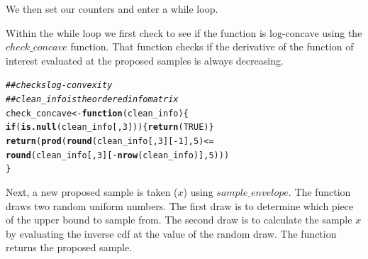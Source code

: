 \documentclass{article}\usepackage[]{graphicx}\usepackage[]{color}
\makeatletter
\newcommand{\hlnum}[1]{\textcolor[rgb]{0.686,0.059,0.569}{#1}}%
\newcommand{\hlcom}[1]{\textcolor[rgb]{0.678,0.584,0.686}{\textit{#1}}}%
\newcommand{\hlopt}[1]{\textcolor[rgb]{0,0,0}{#1}}%
\newcommand{\hlstd}[1]{\textcolor[rgb]{0.345,0.345,0.345}{#1}}%
\newcommand{\hlkwa}[1]{\textcolor[rgb]{0.161,0.373,0.58}{\textbf{#1}}}%
\newcommand{\hlkwb}[1]{\textcolor[rgb]{0.69,0.353,0.396}{#1}}%
\newcommand{\hlkwc}[1]{\textcolor[rgb]{0.333,0.667,0.333}{#1}}%
\newcommand{\hlkwd}[1]{\textcolor[rgb]{0.737,0.353,0.396}{\textbf{#1}}}%
\newenvironment{kframe}{%
 \def\at@end@of@kframe{}%
 \ifinner\ifhmode%
  \def\at@end@of@kframe{\end{minipage}}%
  \begin{minipage}{\columnwidth}%
 \fi\fi%
 \def\FrameCommand##1{\hskip\@totalleftmargin \hskip-\fboxsep
 \colorbox{shadecolor}{##1}\hskip-\fboxsep
     \hskip-\linewidth \hskip-\@totalleftmargin \hskip\columnwidth}%
 \MakeFramed {\advance\hsize-\width
   \@totalleftmargin\z@ \linewidth\hsize
   \@setminipage}}%
 {\par\unskip\endMakeFramed%
 \at@end@of@kframe}
\newenvironment{knitrout}{}{} %
\makeatother
\begin{document}
We then set our counters and enter a while loop.


Within the while loop we first check to see if the function is
log-concave using the $check\_concave$ function. That function checks
if the derivative of the function of interest evaluated at the
proposed samples is always decreasing. 

\begin{knitrout}
\color{fgcolor}\begin{kframe}
\begin{alltt}
\hlcom{## checks log-convexity}
\hlcom{## clean_info is the ordered info matrix}
\hlstd{check_concave} \hlkwb{<-} \hlkwa{function}\hlstd{(}\hlkwc{clean_info}\hlstd{)\{}
  \hlkwa{if}\hlstd{(}\hlkwd{is.null}\hlstd{(clean_info[,}\hlnum{3}\hlstd{])) \{}\hlkwd{return}\hlstd{(}\hlnum{TRUE}\hlstd{)\}}
  \hlkwd{return}\hlstd{(}\hlkwd{prod}\hlstd{(}\hlkwd{round}\hlstd{(clean_info[,}\hlnum{3}\hlstd{][}\hlopt{-}\hlnum{1}\hlstd{],}\hlnum{5}\hlstd{)} \hlopt{<=}
              \hlkwd{round}\hlstd{(clean_info[,}\hlnum{3}\hlstd{][}\hlopt{-}\hlkwd{nrow}\hlstd{(clean_info)],} \hlnum{5}\hlstd{)))}
\hlstd{\}}
\end{alltt}
\end{kframe}
\end{knitrout}

Next, a new proposed sample is taken ($x$) using
$sample\_envelope$. The function draws two random uniform numbers. The
first draw is to determine which piece of the upper bound to sample
from. The second draw is to calculate the sample $x$ by evaluating
the inverse cdf at the value of the random draw. The function returns
the proposed sample.
\end{document}
